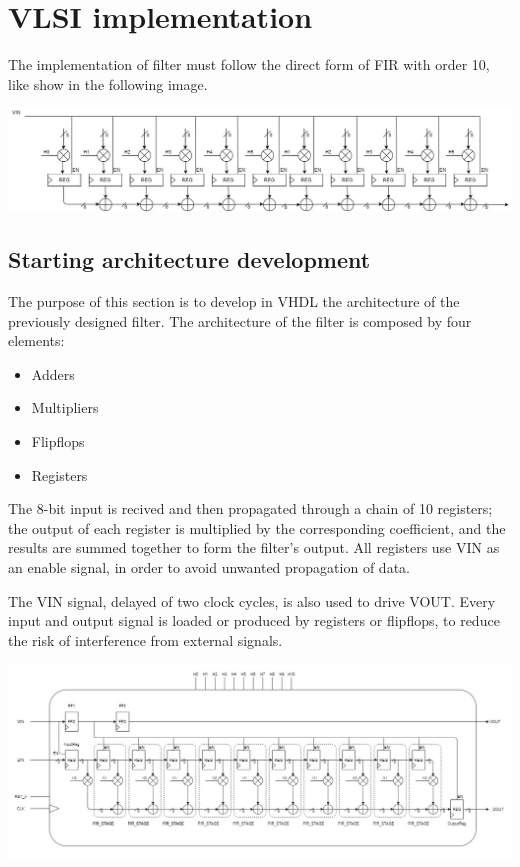 %
\chapter{VLSI implementation}
\label{cha2}

The implementation of filter must follow the direct form of FIR with order 10, like show in the following image.

\centerline{
\includegraphics[width=15.5cm]{./schematic/FIR_stagedrawio.jpg}} 

\section{Starting architecture development}

The purpose of this section is to develop in VHDL the architecture of the previously designed filter. 
The architecture of the filter is composed by four elements:

\begin{itemize}
    \item Adders
    \item Multipliers
    \item Flipflops
    \item Registers
\end{itemize}

The 8-bit input is recived and then propagated through a chain of 10 registers;
the output of each register is multiplied by the corresponding coefficient, and the results are summed together to form the
filter's output. 
All registers use VIN as an enable signal, in order to avoid unwanted propagation of data. 

The VIN signal, delayed of two clock cycles, is also used to drive VOUT. Every input and output signal is loaded or 
produced by registers or flipflops, to reduce the risk of interference from external signals.


\centerline{
\includegraphics[width=15.5cm]{./chapters/figures/fir_base.jpg}} 

